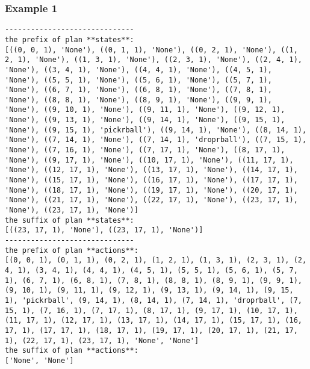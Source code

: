 \subsubsection*{Example 1}
\begin{lstlisting}
------------------------------
the prefix of plan **states**:
[((0, 0, 1), 'None'), ((0, 1, 1), 'None'), ((0, 2, 1), 'None'), ((1, 2, 1), 'None'), ((1, 3, 1), 'None'), ((2, 3, 1), 'None'), ((2, 4, 1), 'None'), ((3, 4, 1), 'None'), ((4, 4, 1), 'None'), ((4, 5, 1), 'None'), ((5, 5, 1), 'None'), ((5, 6, 1), 'None'), ((5, 7, 1), 'None'), ((6, 7, 1), 'None'), ((6, 8, 1), 'None'), ((7, 8, 1), 'None'), ((8, 8, 1), 'None'), ((8, 9, 1), 'None'), ((9, 9, 1), 'None'), ((9, 10, 1), 'None'), ((9, 11, 1), 'None'), ((9, 12, 1), 'None'), ((9, 13, 1), 'None'), ((9, 14, 1), 'None'), ((9, 15, 1), 'None'), ((9, 15, 1), 'pickrball'), ((9, 14, 1), 'None'), ((8, 14, 1), 'None'), ((7, 14, 1), 'None'), ((7, 14, 1), 'droprball'), ((7, 15, 1), 'None'), ((7, 16, 1), 'None'), ((7, 17, 1), 'None'), ((8, 17, 1), 'None'), ((9, 17, 1), 'None'), ((10, 17, 1), 'None'), ((11, 17, 1), 'None'), ((12, 17, 1), 'None'), ((13, 17, 1), 'None'), ((14, 17, 1), 'None'), ((15, 17, 1), 'None'), ((16, 17, 1), 'None'), ((17, 17, 1), 'None'), ((18, 17, 1), 'None'), ((19, 17, 1), 'None'), ((20, 17, 1), 'None'), ((21, 17, 1), 'None'), ((22, 17, 1), 'None'), ((23, 17, 1), 'None'), ((23, 17, 1), 'None')]
the suffix of plan **states**:
[((23, 17, 1), 'None'), ((23, 17, 1), 'None')]
------------------------------
the prefix of plan **actions**:
[(0, 0, 1), (0, 1, 1), (0, 2, 1), (1, 2, 1), (1, 3, 1), (2, 3, 1), (2, 4, 1), (3, 4, 1), (4, 4, 1), (4, 5, 1), (5, 5, 1), (5, 6, 1), (5, 7, 1), (6, 7, 1), (6, 8, 1), (7, 8, 1), (8, 8, 1), (8, 9, 1), (9, 9, 1), (9, 10, 1), (9, 11, 1), (9, 12, 1), (9, 13, 1), (9, 14, 1), (9, 15, 1), 'pickrball', (9, 14, 1), (8, 14, 1), (7, 14, 1), 'droprball', (7, 15, 1), (7, 16, 1), (7, 17, 1), (8, 17, 1), (9, 17, 1), (10, 17, 1), (11, 17, 1), (12, 17, 1), (13, 17, 1), (14, 17, 1), (15, 17, 1), (16, 17, 1), (17, 17, 1), (18, 17, 1), (19, 17, 1), (20, 17, 1), (21, 17, 1), (22, 17, 1), (23, 17, 1), 'None', 'None']
the suffix of plan **actions**:
['None', 'None']
\end{lstlisting}


